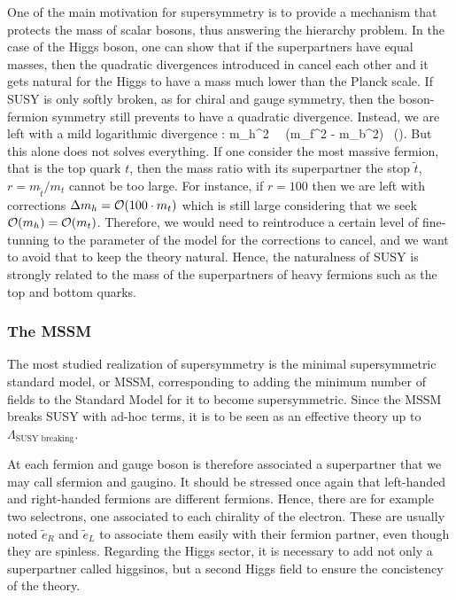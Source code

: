         One of the main motivation for supersymmetry is to provide a mechanism that
        protects the mass of scalar bosons, thus answering the hierarchy problem. In the
        case of the Higgs boson, one can show
        that if the superpartners have equal masses, then the quadratic divergences
        introduced in  cancel each other and
        it gets natural for the Higgs to have a mass much lower than the Planck scale.
        If SUSY is only softly broken, as for chiral and gauge symmetry, then the
        boson-fermion symmetry still prevents to have a quadratic divergence. Instead,
        we are left with a mild logarithmic divergence :
        {
            \Delta m_h^2 \, \propto \, (m_f^2 - m_b^2) \, \left(\right).
        }
        But this alone does not solves everything. If one consider the most massive
        fermion, that is the top quark $t$, then the mass ratio with its superpartner the
        stop $\tilde{t}$, $r = m_{\tilde{t}} / m_t$ cannot be too large. For instance, if
        $r = 100$ then we are left with corrections $\Delta m_h = \mathcal{O}(100 \cdot m_t)$
        which is still large considering that we seek $\mathcal{O}(m_h) = \mathcal{O}(m_t)$.
        Therefore, we would need to reintroduce a certain level of fine-tunning to the
        parameter of the model for the corrections to cancel, and we want to avoid that
        to keep the theory natural. Hence, the naturalness of SUSY is strongly related to
        the mass of the superpartners of heavy fermions such as the top and bottom quarks.

        \subsubsection{The MSSM}

        The most studied realization of supersymmetry is the minimal supersymmetric standard
        model, or MSSM, corresponding to adding the minimum number of fields to the Standard
        Model for it to become supersymmetric. 
        Since the MSSM breaks SUSY with ad-hoc terms, it is to be seen as an effective
        theory up to $\Lambda_{\text{SUSY breaking}}$.

        At each fermion and gauge boson is therefore associated a superpartner that we may
        call sfermion and gaugino. It should be
        stressed once again that left-handed and right-handed fermions are different
        fermions. Hence, there are for example two selectrons, one associated to
        each chirality of the electron. These are usually noted $\tilde{e}_R$ and $\tilde{e}_L$
        to associate them easily with their fermion partner, even though they are spinless.
        Regarding the Higgs sector, it is necessary to add not only a superpartner called
        higgsinos, but a second Higgs field to ensure the concistency of the theory.

